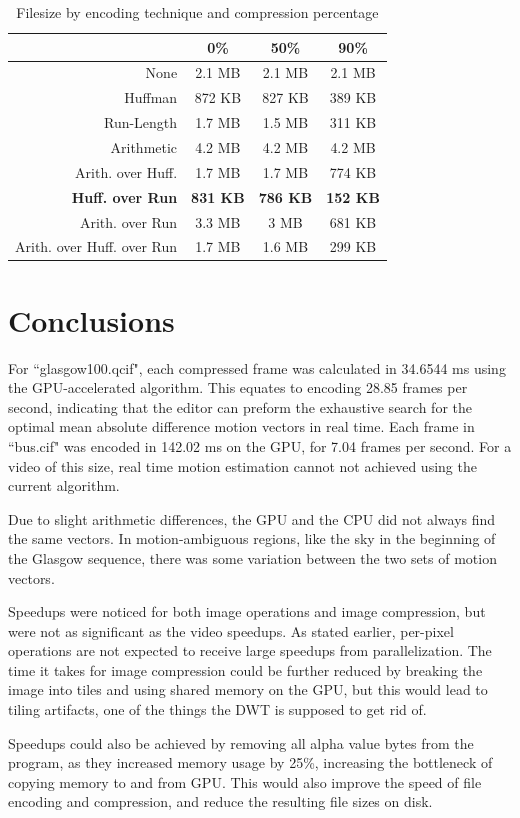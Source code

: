 \documentclass[10pt,twocolumn,twoside]{IEEEtran}
\begin{document}
\begin{table}[htdp]
\caption{Filesize by encoding technique and compression percentage}
\vskip -15pt
\label{table:filesize}
\small{
\begin{center}
\begin{tabular}{|r|c|c|c|}
\hline
 & 0\%  & 50\% & 90\% \\
 \hline
 None & 2.1 MB & 2.1 MB & 2.1 MB\\
 \hline
 Huffman & 872 KB & 827 KB & 389 KB\\
 \hline
 Run-Length & 1.7 MB & 1.5 MB & 311 KB\\
 \hline
 Arithmetic & 4.2 MB & 4.2 MB & 4.2 MB\\
 \hline
 Arith. over Huff. & 1.7 MB & 1.7 MB & 774 KB\\
 \hline
 \textbf{Huff. over Run} & \textbf{831 KB} & \textbf{786 KB} & \textbf{152 KB}\\
 \hline
 Arith. over Run & 3.3 MB & 3 MB & 681 KB\\
 \hline
 Arith. over Huff. over Run & 1.7 MB & 1.6 MB & 299 KB\\
 \hline
\end{tabular}
\end{center}
}
\end{table}


\section{Conclusions}
For ``glasgow100.qcif", each compressed frame was calculated in 34.6544 ms using the GPU-accelerated algorithm. This equates to encoding 28.85 frames per second, indicating that the editor can preform the exhaustive search for the optimal mean absolute difference motion vectors in real time. Each frame in ``bus.cif" was encoded in 142.02 ms on the GPU, for 7.04 frames per second. For a video of this size, real time motion estimation cannot not achieved using the current algorithm.

Due to slight arithmetic differences, the GPU and the CPU did not always find the same vectors. In motion-ambiguous regions, like the sky in the beginning of the Glasgow sequence, there was some variation between the two sets of motion vectors.

Speedups were noticed for both image operations and image compression, but were not as significant as the video speedups. As stated earlier, per-pixel operations are not expected to receive large speedups from parallelization. The time it takes for image compression could be further reduced by breaking the image into tiles and using shared memory on the GPU, but this would lead to tiling artifacts, one of the things the DWT is supposed to get rid of.

Speedups could also be achieved by removing all alpha value bytes from the program, as they increased memory usage by 25\%, increasing the bottleneck of copying memory to and from GPU. This would also improve the speed of file encoding and compression, and reduce the resulting file sizes on disk.



\end{document}
